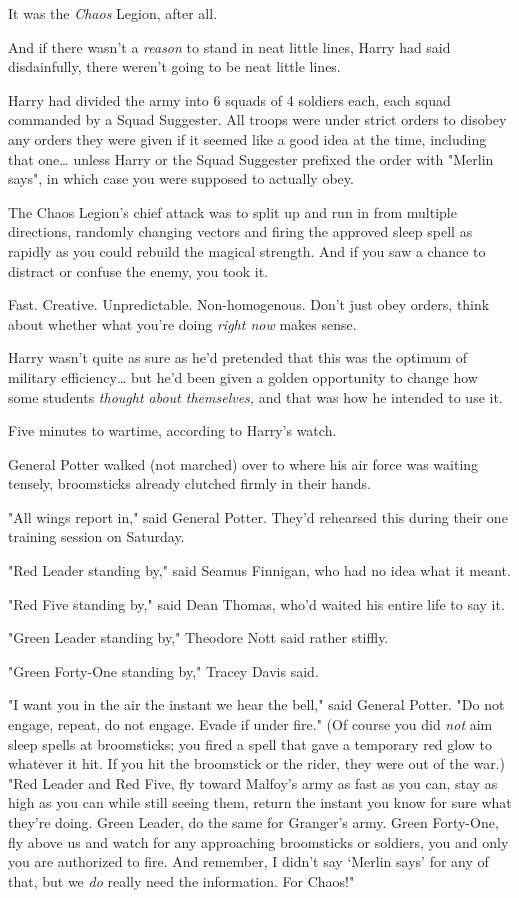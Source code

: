 It was the \emph{Chaos} Legion, after all.

And if there wasn't a \emph{reason} to stand in neat little lines, Harry had
said disdainfully, there weren't going to be neat little lines.

Harry had divided the army into 6 squads of 4 soldiers each, each squad
commanded by a Squad Suggester. All troops were under strict orders to disobey
any orders they were given if it seemed like a good idea at the time, including
that one{\ldots} unless Harry or the Squad Suggester prefixed the order with
"Merlin says", in which case you were supposed to actually obey.

The Chaos Legion's chief attack was to split up and run in from multiple
directions, randomly changing vectors and firing the approved sleep spell as
rapidly as you could rebuild the magical strength. And if you saw a chance to
distract or confuse the enemy, you took it.

Fast. Creative. Unpredictable. Non-homogenous. Don't just obey orders, think
about whether what you're doing \emph{right now} makes sense.

Harry wasn't quite as sure as he'd pretended that this was the optimum of
military efficiency{\ldots} but he'd been given a golden opportunity to change
how some students \emph{thought about themselves,} and that was how he intended
to use it.

Five minutes to wartime, according to Harry's watch.

General Potter walked (not marched) over to where his air force was waiting
tensely, broomsticks already clutched firmly in their hands.

"All wings report in," said General Potter. They'd rehearsed this during their
one training session on Saturday.

"Red Leader standing by," said Seamus Finnigan, who had no idea what it meant.

"Red Five standing by," said Dean Thomas, who'd waited his entire life to say
it.

"Green Leader standing by," Theodore Nott said rather stiffly.

"Green Forty-One standing by," Tracey Davis said.

"I want you in the air the instant we hear the bell," said General Potter. "Do
not engage, repeat, do not engage. Evade if under fire." (Of course you did
\emph{not} aim sleep spells at broomsticks; you fired a spell that gave a
temporary red glow to whatever it hit. If you hit the broomstick or the rider,
they were out of the war.) "Red Leader and Red Five, fly toward Malfoy's army
as fast as you can, stay as high as you can while still seeing them, return the
instant you know for sure what they're doing. Green Leader, do the same for
Granger's army. Green Forty-One, fly above us and watch for any approaching
broomsticks or soldiers, you and only you are authorized to fire. And remember,
I didn't say `Merlin says' for any of that, but we \emph{do} really need the
information. For Chaos!"

